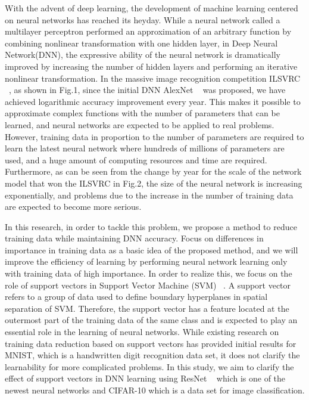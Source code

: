With the advent of deep learning, the development of machine learning centered on neural networks has reached its heyday.
While a neural network called a multilayer perceptron performed an approximation of an arbitrary function by combining nonlinear transformation with one hidden layer, in Deep Neural Network(DNN), the expressive ability of the neural network is dramatically improved by increasing the number of hidden layers and performing an iterative nonlinear transformation.
In the massive image recognition competition ILSVRC ~\cite{bib:deng2009imagenet}, as shown in Fig.1, since the initial DNN AlexNet ~\cite{bib:alexnet-krizhevsky-nips2012} was proposed, we have achieved logarithmic accuracy improvement every year.
This makes it possible to approximate complex functions with the number of parameters that can be learned, and neural networks are expected to be applied to real problems. However, training data in proportion to the number of parameters are required to learn the latest neural network where hundreds of millions of parameters are used, and a huge amount of computing resources and time are required.
Furthermore, as can be seen from the change by year for the scale of the network model that won the ILSVRC in Fig.2, the size of the neural network is increasing exponentially, and problems due to the increase in the number of training data are expected to become more serious.


In this research, in order to tackle this problem, we propose a method to reduce training data while maintaining DNN accuracy. Focus on differences in importance in training data as a basic idea of the proposed method, and we will improve the efficiency of learning by performing neural network learning only with training data of high importance. In order to realize this, we focus on the role of support vectors in Support Vector Machine (SVM) ~\cite{bib:Support-Vector-Networks}. A support vector refers to a group of data used to define boundary hyperplanes in spatial separation of SVM. Therefore, the support vector has a feature located at the outermost part of the training data of the same class and is expected to play an essential role in the learning of neural networks. While existing research on training data reduction based on support vectors has provided initial results for MNIST, which is a handwritten digit recognition data set, it does not clarify the learnability for more complicated problems. In this study, we aim to clarify the effect of support vectors in DNN learning using ResNet ~\cite{bib:Deep-Residual-Learning-for-Image-Recognition} which is one of the newest neural networks and CIFAR-10 which is a data set for image classification.

